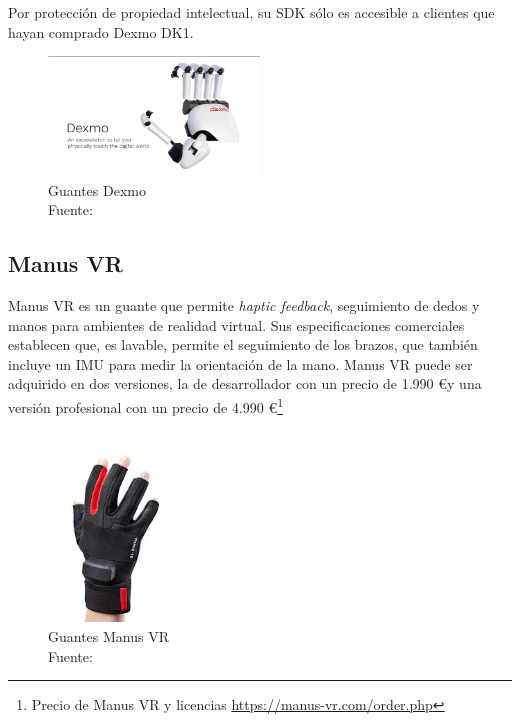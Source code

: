 Por protección de propiedad intelectual, su SDK sólo es accesible a clientes que hayan comprado Dexmo DK1. %
    
            
\begin{figure}[H]
  \begin{center} 
   	\includegraphics[width=0.5\textwidth]{images/chapter02/dexmo.png} 
    \caption[Guantes Dexmo]{Guantes Dexmo \\Fuente: \cite{dexmo-info-page}}  
    \label{fig:dexmo}
  \end{center}
\end{figure}
    
\subsection{Manus VR}
	Manus VR es un guante que permite \textit{haptic feedback}, seguimiento de dedos y manos para ambientes de realidad virtual. Sus especificaciones comerciales establecen que, es lavable, permite el seguimiento de los brazos, que también incluye un IMU para medir la orientación de la mano. Manus VR puede ser adquirido en dos versiones, la de desarrollador con un precio de 1.990 \euro \space y una versión profesional con un precio de 4.990 \euro \space \footnote{Precio de Manus VR y licencias \url{https://manus-vr.com/order.php}}
    
\begin{figure}[H]
  \begin{center} 
   	\includegraphics[width=0.3\textwidth]{images/chapter02/manus-vr.jpeg} 
    \caption[Guantes Manus VR]{Guantes Manus VR \\Fuente: \cite{manusvr-info-page}} 
    \label{fig:manus-vr}
  \end{center}
\end{figure}

